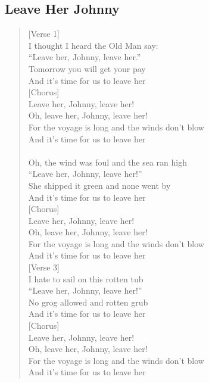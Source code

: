 \documentclass[11pt]{article}
\begin{document}
\subsection{Leave Her Johnny}
\label{sec:orgf613095}
\begin{verse}
[Verse 1]\\
I thought I heard the Old Man say:\\
``Leave her, Johnny, leave her.''\\
Tomorrow you will get your pay\\
And it's time for us to leave her\\
\vspace*{1em}
[Chorus]\\
Leave her, Johnny, leave her!\\
Oh, leave her, Johnny, leave her!\\
For the voyage is long and the winds don't blow\\
And it's time for us to leave her\\
[Verse 2]\\
Oh, the wind was foul and the sea ran high\\
``Leave her, Johnny, leave her!''\\
She shipped it green and none went by\\
And it's time for us to leave her\\
\vspace*{1em}
[Chorus]\\
Leave her, Johnny, leave her!\\
Oh, leave her, Johnny, leave her!\\
For the voyage is long and the winds don't blow\\
And it's time for us to leave her\\
\vspace*{1em}
[Verse 3]\\
I hate to sail on this rotten tub\\
``Leave her, Johnny, leave her!''\\
No grog allowed and rotten grub\\
And it's time for us to leave her\\
\vspace*{1em}
[Chorus]\\
Leave her, Johnny, leave her!\\
Oh, leave her, Johnny, leave her!\\
For the voyage is long and the winds don't blow\\
And it's time for us to leave her\\

\end{verse}
\end{document}

